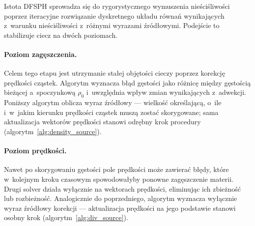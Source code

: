Istota DFSPH sprowadza się do rygorystycznego wymuszenia nieściśliwości poprzez iteracyjne rozwiązanie dyskretnego układu równań wynikających z~warunku nieściśliwości z~różnymi wyrazami źródłowymi. Podejście to stabilizuje ciecz na dwóch poziomach.

\paragraph{Poziom zagęszczenia.}
Celem tego etapu jest utrzymanie stałej objętości cieczy poprzez korekcję prędkości cząstek. Algorytm wyznacza błąd gęstości jako różnicę między gęstością bieżącej a~spoczynkową $\rho_0$ i~uwzględnia wpływ zmian wynikających z~adwekcji. Poniższy algorytm oblicza wyraz źródłowy --- wielkość określającą, o~ile i~w~jakim kierunku prędkości cząstek muszą zostać skorygowane; sama aktualizacja wektorów prędkości stanowi odrębny krok procedury (algorytm~\ref{alg:density_source}).

\begin{algorithm}[ht]
\caption{Wyznaczanie wyrazu źródłowego gęstości \cite{bender2015divergence}}
\label{alg:density_source}
\end{algorithm}

\paragraph{Poziom prędkości.}
Nawet po skorygowaniu gęstości pole prędkości może zawierać błędy, które w~kolejnym kroku czasowym spowodowałyby ponowne zagęszczenie materii. Drugi solver działa wyłącznie na wektorach prędkości, eliminując ich zbieżność lub rozbieżność. Analogicznie do poprzedniego, algorytm wyznacza wyłącznie wyraz źródłowy korekcji --- aktualizacja prędkości na jego podstawie stanowi osobny krok (algorytm~\ref{alg:div_source}).

\begin{algorithm}[ht]
\caption{Wyznaczanie wyrazu źródłowego dywergencji \cite{bender2015divergence}}
\label{alg:div_source}
\end{algorithm}

